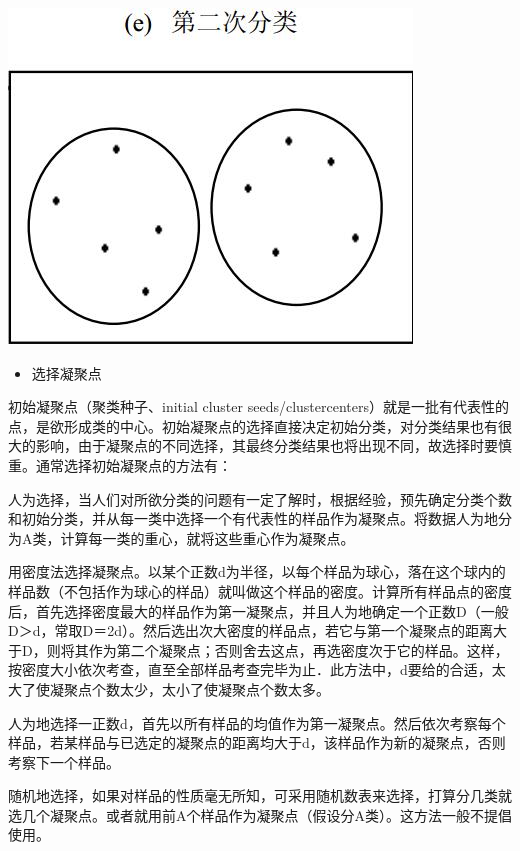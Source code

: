 \documentclass[]{ctexbook}
\providecommand{\tightlist}{%
  \setlength{\itemsep}{0pt}\setlength{\parskip}{0pt}}
\begin{document}
\includegraphics[width=0.8\linewidth,height=0.3\textheight]{fig/fig24}

\begin{itemize}
\tightlist
\item
  选择凝聚点
\end{itemize}

初始凝聚点（聚类种子、initial cluster seeds/clustercenters）就是一批有代表性的点，是欲形成类的中心。初始凝聚点的选择直接决定初始分类，对分类结果也有很大的影响，由于凝聚点的不同选择，其最终分类结果也将出现不同，故选择时要慎重。通常选择初始凝聚点的方法有：

人为选择，当人们对所欲分类的问题有一定了解时，根据经验，预先确定分类个数和初始分类，并从每一类中选择一个有代表性的样品作为凝聚点。将数据人为地分为A类，计算每一类的重心，就将这些重心作为凝聚点。

用密度法选择凝聚点。以某个正数d为半径，以每个样品为球心，落在这个球内的样品数（不包括作为球心的样品）就叫做这个样品的密度。计算所有样品点的密度后，首先选择密度最大的样品作为第一凝聚点，并且人为地确定一个正数D（一般D＞d，常取D＝2d）。然后选出次大密度的样品点，若它与第一个凝聚点的距离大于D，则将其作为第二个凝聚点；否则舍去这点，再选密度次于它的样品。这样，按密度大小依次考查，直至全部样品考查完毕为止．此方法中，d要给的合适，太大了使凝聚点个数太少，太小了使凝聚点个数太多。

人为地选择一正数d，首先以所有样品的均值作为第一凝聚点。然后依次考察每个样品，若某样品与已选定的凝聚点的距离均大于d，该样品作为新的凝聚点，否则考察下一个样品。

随机地选择，如果对样品的性质毫无所知，可采用随机数表来选择，打算分几类就选几个凝聚点。或者就用前A个样品作为凝聚点（假设分A类）。这方法一般不提倡使用。
\end{document}
